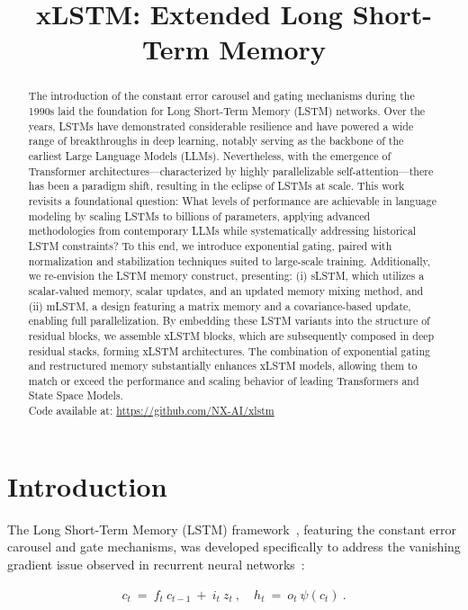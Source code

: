 \title{xLSTM: Extended Long Short-Term Memory}

\begin{abstract}
The introduction of the constant error carousel and gating mechanisms during the 1990s laid the foundation for Long Short-Term Memory (LSTM) networks. Over the years, LSTMs have demonstrated considerable resilience and have powered a wide range of breakthroughs in deep learning, notably serving as the backbone of the earliest Large Language Models (LLMs). Nevertheless, with the emergence of Transformer architectures—characterized by highly parallelizable self-attention—there has been a paradigm shift, resulting in the eclipse of LSTMs at scale. This work revisits a foundational question: What levels of performance are achievable in language modeling by scaling LSTMs to billions of parameters, applying advanced methodologies from contemporary LLMs while systematically addressing historical LSTM constraints? To this end, we introduce exponential gating, paired with normalization and stabilization techniques suited to large-scale training. Additionally, we re-envision the LSTM memory construct, presenting: (i) sLSTM, which utilizes a scalar-valued memory, scalar updates, and an updated memory mixing method, and (ii) mLSTM, a design featuring a matrix memory and a covariance-based update, enabling full parallelization. By embedding these LSTM variants into the structure of residual blocks, we assemble xLSTM blocks, which are subsequently composed in deep residual stacks, forming xLSTM architectures. The combination of exponential gating and restructured memory substantially enhances xLSTM models, allowing them to match or exceed the performance and scaling behavior of leading Transformers and State Space Models.\\
Code available at: \url{https://github.com/NX-AI/xlstm}
\end{abstract}

\section{Introduction}
\label{sec:intro}

The Long Short-Term Memory (LSTM) framework~\citep{Hochreiter:91,Hochreiter:97nips,Hochreiter:97}, featuring the constant error carousel and gate mechanisms, was developed specifically to address the vanishing gradient issue observed in recurrent neural networks~\citep{Hochreiter:91,Hochreiter:00book}:

\begin{align}
\label{eq:lstm_idea}
  c_t \ = \ f_t \ c_{t-1} \ + \ 
          i_t \  z_t \ , \quad  
          h_t \ = \ o_t \ \psi({c_t}) \ . 
\end{align}

